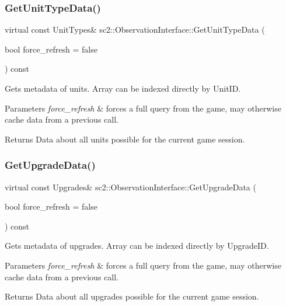 \subsubsection{\texorpdfstring{Get\+Unit\+Type\+Data()}{GetUnitTypeData()}}
{\footnotesize\ttfamily virtual const Unit\+Types\& sc2\+::\+Observation\+Interface\+::\+Get\+Unit\+Type\+Data (\begin{DoxyParamCaption}\item[{bool}]{force\+\_\+refresh = {\ttfamily false} }\end{DoxyParamCaption}) const\hspace{0.3cm}{\ttfamily [pure virtual]}}

Gets metadata of units. Array can be indexed directly by Unit\+ID. 
\begin{DoxyParams}{Parameters}
{\em force\+\_\+refresh} & forces a full query from the game, may otherwise cache data from a previous call. \\
\hline
\end{DoxyParams}
\begin{DoxyReturn}{Returns}
Data about all units possible for the current game session. 
\end{DoxyReturn}
\mbox{\label{classsc2_1_1_observation_interface_a10b0d3b3131951ad656cb091aaa2040d}} 
\subsubsection{\texorpdfstring{Get\+Upgrade\+Data()}{GetUpgradeData()}}
{\footnotesize\ttfamily virtual const Upgrades\& sc2\+::\+Observation\+Interface\+::\+Get\+Upgrade\+Data (\begin{DoxyParamCaption}\item[{bool}]{force\+\_\+refresh = {\ttfamily false} }\end{DoxyParamCaption}) const\hspace{0.3cm}{\ttfamily [pure virtual]}}

Gets metadata of upgrades. Array can be indexed directly by Upgrade\+ID. 
\begin{DoxyParams}{Parameters}
{\em force\+\_\+refresh} & forces a full query from the game, may otherwise cache data from a previous call. \\
\hline
\end{DoxyParams}
\begin{DoxyReturn}{Returns}
Data about all upgrades possible for the current game session. 
\end{DoxyReturn}
\mbox{\label{classsc2_1_1_observation_interface_a0a794661f0072921a75d4c5851cfb9e9}} 
